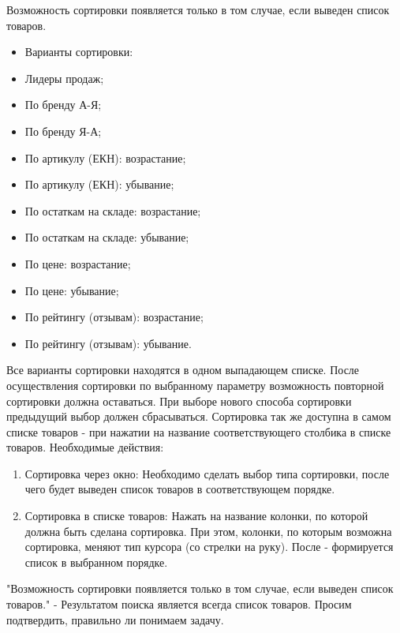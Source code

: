 {

\begin{wikilong}
Возможность сортировки появляется только в том случае, если выведен список товаров.
\begin{itemize}
\item Варианты сортировки:
\item Лидеры продаж;
\item По бренду А-Я;
\item По бренду Я-А;
\item По артикулу (ЕКН): возрастание;
\item По артикулу (ЕКН): убывание;
\item По остаткам на складе: возрастание;
\item По остаткам на складе: убывание;
\item По цене: возрастание;
\item По цене: убывание;
\item По рейтингу (отзывам): возрастание;
\item По рейтингу (отзывам): убывание.
\end{itemize}
Все варианты сортировки находятся в одном выпадающем списке.
После осуществления сортировки по выбранному параметру возможность повторной сортировки должна оставаться.
При выборе нового способа сортировки предыдущий выбор должен сбрасываться.
Сортировка так же доступна в самом списке товаров - при нажатии на название соответствующего столбика в списке товаров.
Необходимые действия:
\begin{enumerate}
\item Сортировка через окно:
Необходимо сделать выбор типа сортировки, после чего будет выведен список товаров в соответствующем порядке.
\item Сортировка в списке товаров:
Нажать на название колонки, по которой должна быть сделана сортировка. При этом, колонки, по которым возможна сортировка, меняют тип курсора (со стрелки на руку). После - формируется список в выбранном порядке.
\end{enumerate}
\end{wikilong}

\begin{teamidea}

"Возможность сортировки появляется только в том случае, если выведен список товаров." - Результатом поиска является всегда список товаров. Просим подтвердить, правильно ли понимаем задачу.


\end{teamidea}}
